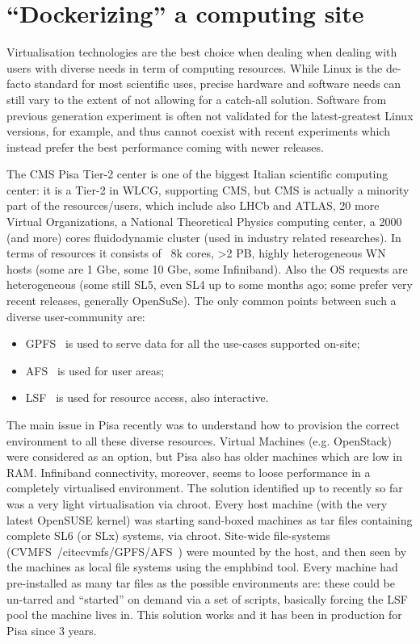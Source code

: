\documentclass{PoS}
\begin{document}
\section{``Dockerizing'' a computing site}
Virtualisation technologies are the best choice when dealing when dealing with users with diverse needs in term of computing resources. While Linux is the de-facto standard for most scientific uses, precise hardware and software needs can still vary to the extent of not allowing for a catch-all solution. Software from previous generation experiment is often not validated for the latest-greatest Linux versions, for example, and thus cannot coexist with recent experiments which instead prefer the best performance coming with newer releases.

The CMS Pisa Tier-2 center is one of the biggest Italian scientific computing center: it is a Tier-2 in WLCG, supporting CMS, but CMS is actually a minority part of the resources/users, which include also LHCb and ATLAS, 20 more Virtual Organizations, a National Theoretical Physics computing center, a 2000 (and more) cores fluidodynamic cluster (used in industry related researches). In terms of resources it consists of ~8k cores, >2 PB, highly heterogeneous WN hosts (some are 1 Gbe, some 10 Gbe, some Infiniband). Also the OS requests are heterogeneous (some still SL5, even SL4 up to some months ago; some prefer very recent releases, generally OpenSuSe). The only common points between such a diverse user-community are: 

\begin{itemize}
\item GPFS~\cite{gpfs} is used to serve data for all the use-cases supported on-site;
\item AFS~\cite{afs} is used for user areas; 
\item LSF~\cite{lsf} is used for resource access, also interactive.
\end{itemize}

The main issue in Pisa recently was to understand how to provision the correct environment to all these diverse resources. Virtual Machines (e.g. OpenStack) were considered as an option, but
Pisa also has older machines which are low in RAM. Infiniband connectivity, moreover, seems to loose performance in a completely virtualised environment. The solution identified up to recently so far was a very light virtualisation via chroot. Every host machine (with the very latest OpenSUSE kernel) was starting sand-boxed machines as tar files containing complete SL6 (or SLx) systems,  via chroot. Site-wide file-systems (CVMFS~/cite{cvmfs}/GPFS/AFS~\cite{afs}) were mounted by the host, and then seen by the machines as local file systems using the emph{bind}  tool.
Every machine had pre-installed as many tar files as the possible environments are: these could be un-tarred and ``started'' on demand via a set of scripts, basically forcing the LSF pool the machine lives in. This solution works and it has been in production for Pisa since 3 years.
\end{document}
